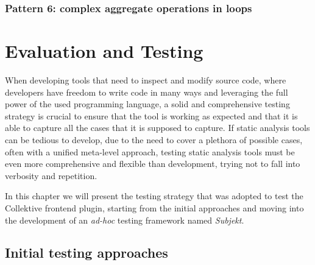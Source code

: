 \documentclass[12pt,a4paper,openright,twoside]{book}
\begin{document}
\subsection{Pattern 6: complex aggregate operations in loops} \label{sec:p6}

\chapter{Evaluation and Testing}
\label{chap:evaluation}

When developing tools that need to inspect and modify source code, where
developers have freedom to write code in many ways and leveraging the full power of the 
used programming language, a solid and comprehensive testing strategy is crucial to 
ensure that the tool is working as expected and that it is able to capture all the
cases that it is supposed to capture.
%
If static analysis tools can be tedious to develop, due to the need to cover a
plethora of possible cases, often with a unified meta-level approach, testing
static analysis tools must be even more comprehensive and flexible than
development, trying not to fall into verbosity and repetition.

In this chapter we will present the testing strategy that was adopted to test the 
Collektive frontend plugin, starting from the initial approaches and moving into the 
development of an \emph{ad-hoc} testing framework named \emph{Subjekt}.

\section{Initial testing approaches}
\end{document}
